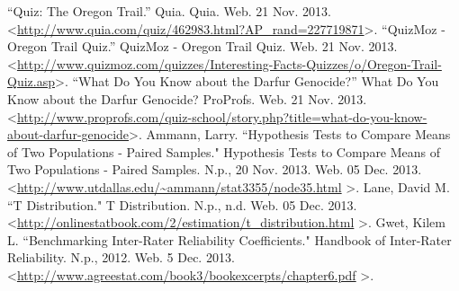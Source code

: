 \documentclass[12pt]{report}
\begin{document}
\begin{thebibliography}{1}
\bibitem{} ``Quiz: The Oregon Trail.'' Quia. Quia. Web. 21 Nov. 2013. \textless \url{http://www.quia.com/quiz/462983.html?AP\_rand=227719871}\textgreater.
\bibitem{} ``QuizMoz - Oregon Trail Quiz.'' QuizMoz - Oregon Trail Quiz. Web. 21 Nov. 2013. \textless \url{http://www.quizmoz.com/quizzes/Interesting-Facts-Quizzes/o/Oregon-Trail-Quiz.asp}\textgreater.
\bibitem{} ``What Do You Know about the Darfur Genocide?'' What Do You Know about the Darfur Genocide? ProProfs. Web. 21 Nov. 2013. \textless \url{http://www.proprofs.com/quiz-school/story.php?title=what-do-you-know-about-darfur-genocide}\textgreater.
 Ammann, Larry. ``Hypothesis Tests to Compare Means of Two Populations - Paired Samples." Hypothesis Tests to Compare Means of Two Populations - Paired Samples. N.p., 20 Nov. 2013. Web. 05 Dec. 2013. \textless \url{http://www.utdallas.edu/~ammann/stat3355/node35.html} \textgreater.
 Lane, David M. ``T Distribution." T Distribution. N.p., n.d. Web. 05 Dec. 2013. \textless \url{http://onlinestatbook.com/2/estimation/t_distribution.html} \textgreater.
 Gwet, Kilem L. ``Benchmarking Inter-Rater Reliability Coeﬃcients." Handbook of Inter-Rater Reliability. N.p., 2012. Web. 5 Dec. 2013. \textless \url{http://www.agreestat.com/book3/bookexcerpts/chapter6.pdf} \textgreater.

\end{thebibliography}
\end{document}
